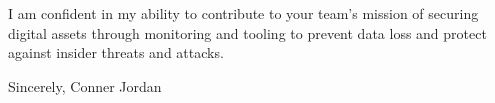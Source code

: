 \documentclass[letterpaper,11pt]{article}
\begin{document}
\vspace{16pt}

I am confident in my ability to contribute to your team's mission of securing digital assets through monitoring and tooling to prevent data loss and protect against insider threats and attacks.

\vspace{16pt}

Sincerely,  
Conner Jordan
\end{document}

